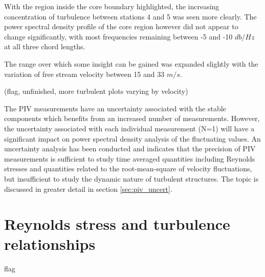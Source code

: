 



With the region inside the core boundary highlighted, the increasing
concentration of turbulence between stations 4 and 5 was seen more clearly. The 
power spectral density profile of the core region however did not appear to 
change significantly, with most frequencies remaining between -5 and -10 
$db/Hz$ at all three chord lengths. 





The range over which some insight can be gained was 
expanded slightly with the variation of free stream velocity between 15 and 33 
$m/s$.

(flag, unfinished, more turbulent plots varying by velocity)

The PIV measurements have an uncertainty associated with the stable components 
which benefits from an increased number of measurements. However, the 
uncertainty associated with each individual measurement (N=1) will have a 
significant impact on power spectral density analysis of the fluctuating 
values. An uncertainty analysis has been conducted and indicates that the 
precision of PIV measurements is sufficient to study time averaged quantities 
including Reynolds stresses and quantities related to the root-mean-square of 
velocity fluctuations, but insufficient to study the dynamic nature of 
turbulent structures. The topic is discussed in greater detail in section 
\ref{sec:piv_uncert}.

\section{Reynolds stress and turbulence relationships}

flag